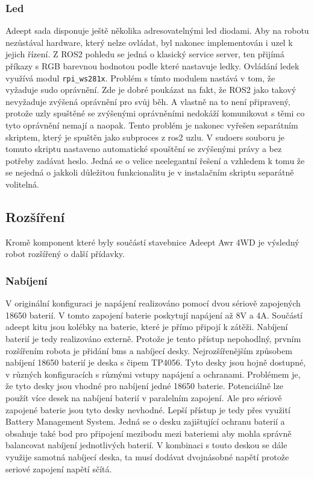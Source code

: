 \subsubsection*{Led}
Adeept sada disponuje ještě několika adresovatelnými led diodami. Aby na robotu nezůstával hardware, který nelze ovládat, byl nakonec implementován i uzel k jejich řízení. Z ROS2 pohledu se jedná o klasický service server, ten přijímá příkazy s RGB barevnou hodnotou podle které nastavuje ledky. Ovládání ledek využívá modul \verb|rpi_ws281x|. Problém s tímto modulem nastává v tom, že vyžaduje sudo oprávnění. Zde je dobré poukázat na fakt, že ROS2 jako takový nevyžaduje zvýšená oprávnění pro svůj běh. A vlastně na to není připravený, protože uzly spuštěné se zvýšenými oprávněními nedokáží komunikovat s těmi co tyto oprávnění nemají a naopak. Tento problém je nakonec vyřešen separátním skriptem, který je spuštěn jako subproces z ros2 uzlu. V sudoers souboru je tomuto skriptu nastaveno automatické spouštění se zvýšenými právy a bez potřeby zadávat heslo. Jedná se o velice neelegantní řešení a vzhledem k tomu že se nejedná o jakkoli důležitou funkcionalitu je v instalačním skriptu separátně volitelná.

\subsection*{Rozšíření}
Kromě komponent které byly součástí stavebnice Adeept Awr 4WD je výsledný robot rozšířený o další přídavky.

\subsubsection*{Nabíjení}
V originální konfiguraci je napájení realizováno pomocí dvou sériově zapojených 18650 baterií. V tomto zapojení baterie poskytují napájení až 8V a 4A. Součástí adeept kitu jsou kolébky na baterie, které je přímo připojí k zátěži. Nabíjení baterií je tedy realizováno externě. Protože je tento přístup nepohodlný, prvním rozšířením robota je přidání bms a nabíjecí desky. 
Nejrozšířenějším způsobem nabíjení 18650 baterií je deska s čipem TP4056. Tyto desky jsou hojně dostupné, v různých konfiguracích s různými vstupy napájení a ochranami. Problémem je, že tyto desky jsou vhodné pro nabíjení jedné 18650 baterie. Potenciálně lze použít více desek na nabíjení baterií v paralelním zapojení. Ale pro sériově zapojené baterie jsou tyto desky nevhodné.
Lepší přístup je tedy přes využití Battery Management System. Jedná se o desku zajištující ochranu baterií a obsahuje také bod pro připojení mezibodu mezi bateriemi aby mohla správně balancovat nabíjení jednotlivých baterií. V kombinaci s touto deskou se dále využije samotná nabíjecí deska, ta musí dodávat dvojnásobné napětí protože seriové zapojení napětí sčítá.


